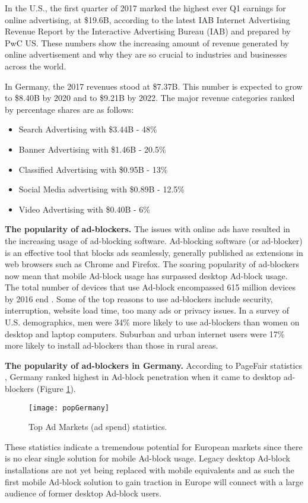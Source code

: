 \documentclass[runningheads,a4paper]{llncs}
\begin{document}
In the U.S., the first quarter of 2017 marked the highest ever Q1 earnings for online advertising, at \$19.6B, according to the latest IAB Internet Advertising Revenue Report by the Interactive Advertising Bureau (IAB) and prepared by PwC US. These numbers show the increasing amount of revenue generated by online advertisement and why they are so crucial to industries and businesses across the world.

In Germany, the 2017 revenues stood at \$7.37B. This number is expected to grow to \$8.40B by 2020 and to \$9.21B by 2022. The major revenue categories ranked by percentage shares are as follows:
\begin{itemize}
	\item Search Advertising with \$3.44B - 48\%
	\item Banner Advertising with \$1.46B - 20.5\%
    \item Classified Advertising with \$0.95B - 13\%
    \item Social Media advertising with \$0.89B - 12.5\%
    \item Video Advertising with \$0.40B - 6\%
\end{itemize}

\textbf{The popularity of ad-blockers.} The issues with online ads have resulted in the increasing usage of ad-blocking software. Ad-blocking software (or ad-blocker) is an effective tool that blocks ads seamlessly, generally published as extensions in web browsers such as Chrome and Firefox. The soaring popularity of ad-blockers now mean that mobile Ad-block usage has surpassed desktop Ad-block usage. The total number of devices that use Ad-block encompassed 615 million devices by 2016 end \cite{popularity2017}. Some of the top reasons to use ad-blockers include security, interruption, website load time, too many ads or privacy issues. In a survey of U.S. demographics, men were 34\% more likely to use ad-blockers than women on desktop and laptop computers. Suburban and urban internet users were 17\% more likely to install ad-blockers than those in rural areas.

\textbf{The popularity of ad-blockers in Germany.} According to PageFair statistics \cite{popularity2017}, Germany ranked highest in Ad-block penetration when it came to desktop ad-blockers (Figure \ref{fig:popGermany}). \begin{figure}
\centering
\texttt{[image: popGermany]}
\caption{Top Ad Markets (ad spend) statistics.}
\label{fig:popGermany}
\end{figure}
These statistics indicate a tremendous potential for European markets since there is no clear single solution for mobile Ad-block usage. Legacy desktop Ad-block installations are not yet being replaced with mobile equivalents and as such the first mobile Ad-block solution to gain traction in Europe will connect with a large audience of former desktop Ad-block users.
\end{document}
